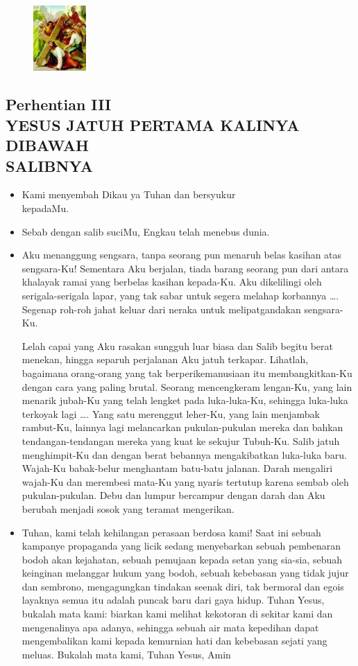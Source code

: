 \documentclass[a5paper,headsepline,titlepage,10pt,nnormalheadings,DIVcalc]{scrbook}
\newcommand{\BU}[1]{\begin{itemize} \item[U:] #1 \end{itemize}}
\newcommand{\BP}[1]{\begin{itemize} \item[P:] #1 \end{itemize}}
\newcommand{\kamiMenyembah}{\BP{ Kami menyembah Dikau ya Tuhan dan bersyukur\\kepadaMu.}
\BU{ Sebab dengan salib suciMu, Engkau telah menebus dunia.}
}
\begin{document}
\begin{figure}
\includegraphics[width=2cm]{jalansalib_files/03_small.jpg}
\end{figure}
\subsection*{Perhentian III\\
YESUS JATUH PERTAMA KALINYA DIBAWAH\\SALIBNYA}

\kamiMenyembah
\BP{Aku menanggung sengsara, tanpa seorang pun menaruh belas kasihan atas sengsara-Ku! Sementara Aku berjalan, tiada barang seorang pun dari antara khalayak ramai yang berbelas kasihan kepada-Ku. Aku dikelilingi oleh serigala-serigala lapar, yang tak sabar untuk segera melahap korbannya \dots . Segenap roh-roh jahat keluar dari neraka untuk melipatgandakan sengsara-Ku.

Lelah capai yang Aku rasakan sungguh luar biasa dan Salib begitu berat menekan, hingga separuh perjalanan Aku jatuh terkapar. Lihatlah, bagaimana orang-orang yang tak berperikemanusiaan itu membangkitkan-Ku dengan cara yang paling brutal. Seorang mencengkeram lengan-Ku, yang lain menarik jubah-Ku yang telah lengket pada luka-luka-Ku, sehingga luka-luka terkoyak lagi \dots . Yang satu merenggut leher-Ku, yang lain menjambak rambut-Ku, lainnya lagi melancarkan pukulan-pukulan mereka dan bahkan tendangan-tendangan mereka yang kuat ke sekujur Tubuh-Ku. Salib jatuh menghimpit-Ku dan dengan berat bebannya mengakibatkan luka-luka baru. Wajah-Ku babak-belur menghantam batu-batu jalanan. Darah mengaliri wajah-Ku dan merembesi mata-Ku yang nyaris tertutup karena sembab oleh pukulan-pukulan. Debu dan lumpur bercampur dengan darah dan Aku berubah menjadi sosok yang teramat mengerikan.}

\BU{Tuhan, kami telah kehilangan perasaan berdosa kami! Saat ini sebuah kampanye propaganda yang licik sedang menyebarkan sebuah pembenaran bodoh akan kejahatan, sebuah pemujaan kepada setan yang sia-sia, sebuah keinginan melanggar hukum yang bodoh, sebuah kebebasan yang tidak jujur dan sembrono, mengagungkan tindakan seenak diri, tak bermoral dan egois layaknya semua itu adalah puncak baru dari gaya hidup. Tuhan Yesus, bukalah mata kami: biarkan kami melihat kekotoran di sekitar kami dan mengenalinya apa adanya, sehingga sebuah air mata kepedihan dapat mengembalikan kami kepada kemurnian hati dan kebebasan sejati yang meluas. Bukalah mata kami, Tuhan Yesus, Amin 
}
\end{document}
